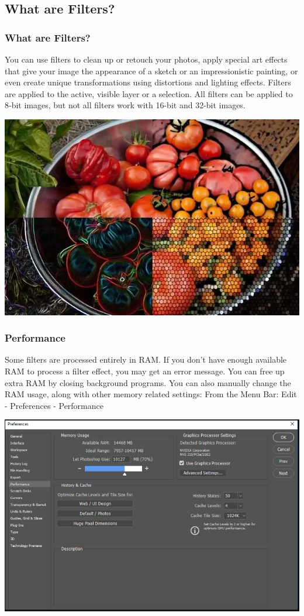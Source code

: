 \documentclass{beamer}
\begin{document}
			\subsection{What are Filters?}		
	\begin{frame}
		\frametitle{What are Filters?}
	\begin{outline}
		\1 You can use filters to clean up or retouch your photos, apply special art effects that give your image the appearance of a sketch or an impressionistic painting, or even create unique transformations using distortions and lighting effects. 
		\1 Filters are applied to the active, visible layer or a selection.
		\1 All filters can be applied to 8‑bit images, but not all filters work with 16-bit and 32-bit images.
	\end{outline}
\begin{center}
	\includegraphics[width=.7\textwidth]{images/filters.png}
	\end{center}
		\end{frame}

\begin{frame}
		\frametitle{Performance}

	\begin{outline}
		\1 Some filters are processed entirely in RAM. If you don’t have enough available RAM to process a filter effect, you may get an error message.
		\1 You can free up extra RAM by closing background programs.
		\1 You can also manually change the RAM usage, along with other memory related settings:
		\2 From the Menu Bar:  Edit - Preferences - Performance
	\end{outline}
\begin{center}
	\includegraphics[width=.7\textwidth]{images/performance.png}
	\end{center}
\end{frame}
\end{document}
